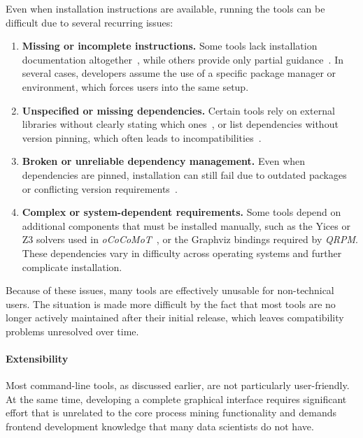 Even when installation instructions are available, running the tools can be difficult due to several recurring issues:

\begin{enumerate}[label=\arabic*., leftmargin=1.2cm]
	\item \textbf{Missing or incomplete instructions.}
	      Some tools lack installation documentation altogether~\cite{supervariants}, while others provide only partial guidance~\cite{ocpsm}. In several cases, developers assume the use of a specific package manager or environment, which forces users into the same setup.

	\item \textbf{Unspecified or missing dependencies.}
	      Certain tools rely on external libraries without clearly stating which ones~\cite{oxminer, supervariants}, or list dependencies without version pinning, which often leads to incompatibilities~\cite{aoe}.

	\item \textbf{Broken or unreliable dependency management.}
	      Even when dependencies are pinned, installation can still fail due to outdated packages or conflicting version requirements~\cite{proact, opera}.

	\item \textbf{Complex or system-dependent requirements.}
	      Some tools depend on additional components that must be installed manually, such as the Yices or Z3 solvers used in \textit{oCoCoMoT}~\cite{ococomot}, or the Graphviz bindings required by \textit{QRPM}. These dependencies vary in difficulty across operating systems and further complicate installation.
\end{enumerate}

Because of these issues, many tools are effectively unusable for non-technical users. The situation is made more difficult by the fact that most tools are no longer actively maintained after their initial release, which leaves compatibility problems unresolved over time.

\paragraph{Extensibility}

Most command-line tools, as discussed earlier, are not particularly user-friendly. At the same time, developing a complete graphical interface requires significant effort that is unrelated to the core process mining functionality and demands frontend development knowledge that many data scientists do not have.

